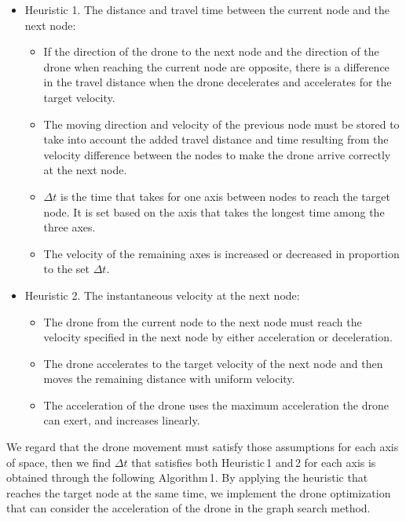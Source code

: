 \documentclass[journal]{./template/IEEEtran}
\begin{document}
\begin{itemize}
\item Heuristic 1. The distance and travel time between the current node and the next node:
  \begin{itemize}
      \item If the direction of the drone to the next node and the direction of the drone when reaching the current node are opposite, there is a difference in the travel distance when the drone decelerates and accelerates for the target velocity.
      \item The moving direction and velocity of the previous node must be stored to take into account the added travel distance and time resulting from the velocity difference between the nodes to make the drone arrive correctly at the next node.
      \item $\Delta t$ is the time that takes for one axis between nodes to reach the target node. It is set based on the axis that takes the longest time among the three axes.
      \item The velocity of the remaining axes is increased or decreased in proportion to the set $\Delta t$.
  \end{itemize}
\item Heuristic 2. The instantaneous velocity at the next node:
  \begin{itemize}
      \item The drone from the current node to the next node must reach the velocity specified in the next node by either acceleration or deceleration.
      \item The drone accelerates to the target velocity of the next node and then moves the remaining distance with uniform velocity.
      \item The acceleration of the drone uses the maximum acceleration the drone can exert, and increases linearly.  
  \end{itemize}
\end{itemize}

We regard that the drone movement must satisfy those assumptions for each axis of space, then we find $\Delta t$ that satisfies both Heuristic\,1 and\,2 for each axis is obtained through the following Algorithm\,1. 
By applying the heuristic that reaches the target node at the same time, we implement the drone optimization that can consider the acceleration of the drone in the graph search method.
\end{document}
